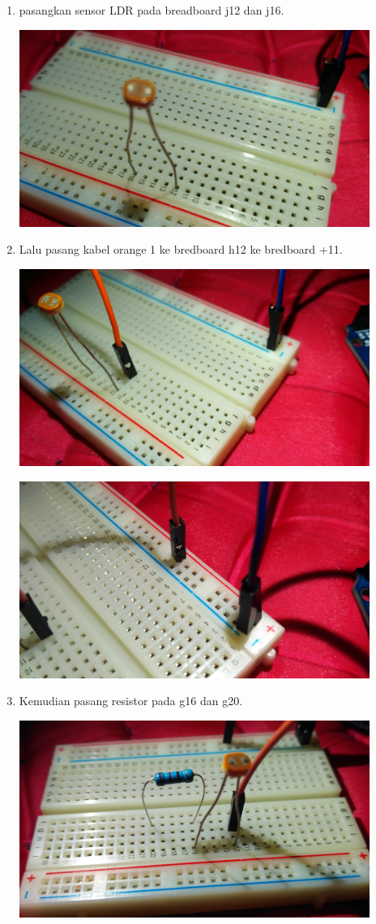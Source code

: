 \documentclass{article}
\begin{document}
\begin{enumerate}
	\break
	\item pasangkan sensor LDR pada breadboard j12 dan j16.
	\break
	\centerline{\includegraphics[width=0.9\textwidth]{figures/5.jpg}}
	\break
	\item Lalu pasang kabel orange 1 ke bredboard h12 ke bredboard +11.
	\break
	\centerline{\includegraphics[width=0.9\textwidth]{figures/6.jpg}}
	\break
	\centerline{\includegraphics[width=0.9\textwidth]{figures/7.jpg}}
	\break
	\item  Kemudian pasang resistor pada g16 dan g20.
	\break
	\centerline{\includegraphics[width=0.9\textwidth]{figures/8.jpg}}

\end{enumerate}
\end{document}
